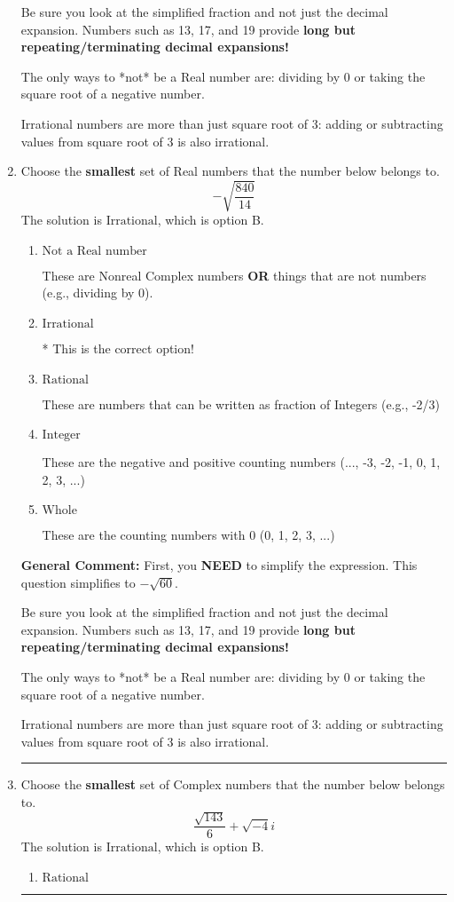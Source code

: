 \documentclass{extbook}[14pt]
\newcommand{\litem}[1]{\item #1

\rule{\textwidth}{0.4pt}}
\begin{document}
\begin{enumerate}
{ Be sure you look at the simplified fraction and not just the decimal expansion. Numbers such as 13, 17, and 19 provide \textbf{long but repeating/terminating decimal expansions!} 
 
 The only ways to *not* be a Real number are: dividing by 0 or taking the square root of a negative number. 
 
 Irrational numbers are more than just square root of 3: adding or subtracting values from square root of 3 is also irrational.
}
\litem{
Choose the \textbf{smallest} set of Real numbers that the number below belongs to.
\[ -\sqrt{\frac{840}{14}} \]The solution is \( \text{Irrational} \), which is option B.\begin{enumerate}[label=\Alph*.]
\item \( \text{Not a Real number} \)

These are Nonreal Complex numbers \textbf{OR} things that are not numbers (e.g., dividing by 0).
\item \( \text{Irrational} \)

* This is the correct option!
\item \( \text{Rational} \)

These are numbers that can be written as fraction of Integers (e.g., -2/3)
\item \( \text{Integer} \)

These are the negative and positive counting numbers (..., -3, -2, -1, 0, 1, 2, 3, ...)
\item \( \text{Whole} \)

These are the counting numbers with 0 (0, 1, 2, 3, ...)
\end{enumerate}

\textbf{General Comment:} First, you \textbf{NEED} to simplify the expression. This question simplifies to $-\sqrt{60}$. 
 
 Be sure you look at the simplified fraction and not just the decimal expansion. Numbers such as 13, 17, and 19 provide \textbf{long but repeating/terminating decimal expansions!} 
 
 The only ways to *not* be a Real number are: dividing by 0 or taking the square root of a negative number. 
 
 Irrational numbers are more than just square root of 3: adding or subtracting values from square root of 3 is also irrational.
}
\litem{
Choose the \textbf{smallest} set of Complex numbers that the number below belongs to.
\[ \frac{\sqrt{143}}{6}+\sqrt{-4}i \]The solution is \( \text{Irrational} \), which is option B.\begin{enumerate}[label=\Alph*.]
\item \( \text{Rational} \)


\end{enumerate}}
\end{enumerate}
\end{document}
